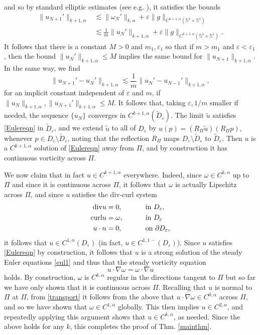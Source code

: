 \documentclass[11pt]{article}
\theoremstyle{plain}
\numberwithin{equation}{section}
\theoremstyle{remark}
\renewcommand{\div}{{\rm div}}
\newcommand{\curl}{{\rm curl}}
\newcommand{\ve}{{\varepsilon}}
\newcommand{\pa}{\partial}
\begin{document}
and so by standard elliptic estimates (see e.g. \cite{ADN64}), it satisfies the bounds
\begin{align}
  \label{}
  \|u_{N+1}'\|_{k+1, \alpha}
  &\lesssim \|\omega_N'\|_{k, \alpha} + 
  \ve\|g\|_{C^{k+1,\alpha}(\mathbb{S}^1\times \mathbb{S}^1)}\\
  &\lesssim  
  \frac{1}{m}\|u_N'\|_{k+1, \alpha} + \ve \|g\|_{C^{k+1,\alpha}(\mathbb{S}^1\times \mathbb{S}^1)}.
\end{align}
It follows that there is a constant $M > 0$ and $m_1, \ve_1$ so that if $m > m_1$ and $\ve < \ve_1$, 
then the bound $ \|u_N'\|_{k+1, \alpha} \leq M$ implies the same bound for $\|u_{N+1}\|_{k+1, \alpha}$.
In the same way, we find
\begin{equation}
  \label{}
  \|u_{N+1}' - u_{N}'\|_{k+1, \alpha} \lesssim \frac{1}{m} 
  \|u_N' - u_{N-1}'\|_{k+1, \alpha},
\end{equation}
for an implicit constant independent of $\ve$ and $m$,
if $\|u_{N}\|_{k+1,\alpha}, \|u_{N+1}'\|_{k+1,\alpha} \leq M.$
It follows that, taking $\ve, 1/m$ smaller if needed, the sequence $\{u_N\}$ converges
in $C^{k+1,\alpha}(\widetilde{D}_\ve)$. The limit $\widetilde{u}$
satisfies \eqref{Eulereqn} in $\widetilde{D}_\ve$, and 
we extend $\widetilde{u}$ to all of $D_\ve$ by
$
  u(p) = (R_\Pi\widetilde{u})(R_\Pi p),
  $
whenever $p \in D_\ve \setminus \widetilde{D}_\ve$, noting that
the reflection $R_\Pi$ maps $D_\ve \setminus \widetilde{D}_\ve$
to $\widetilde{D}_\ve$. 
Then $u$ is a $C^{k+1,\alpha}$ solution of \eqref{Eulereqn} away
from $\Pi$,
and by construction it has continuous vorticity
across $\Pi$. 

We now claim that in fact $u \in C^{k+1, \alpha}$ everywhere.
Indeed, since $\omega \in C^{k,\alpha}$ up to $\Pi$ and since it
is continuous across $\Pi$, it follows that $\omega$ is actually
Lipschitz across $\Pi$, and since $u$ satisfies the div-curl system
\begin{alignat}{2}
  \label{}
  \div u &=0, &&\qquad \text{ in } D_\ve,\\
  \curl u &= \omega, &&\qquad \text{ in } D_\ve\\ 
  u\cdot n &= 0, &&\qquad \text{ on } \pa D_\ve,
\end{alignat}
it follows that $u\in C^{1, \alpha}(D_\ve)$
(in fact, $u\in C^{1, 1-}(D_\ve)$).
Since $u$ satisfies \eqref{Eulereqn} by construction, it
follows that $u$ is a strong solution of the steady Euler equations
\eqref{eul1} and thus that the steady vorticity equation
\begin{equation}
  \label{transport}
    u\cdot \nabla \omega = \omega\cdot\nabla u
\end{equation}
holds. By construction, $\omega$ is $C^{k,\alpha}$ regular in the directions
tangent to $\Pi$ but so far we have only shown that it is continuous across $\Pi$.
Recalling that $u$ is normal to $\Pi$ at $\Pi$, from
\eqref{transport} it follows from the above that $u\cdot \nabla \omega
\in C^{0, \alpha}$ across $\Pi$, and so we have shown
that $\omega \in C^{1, \alpha}$ globally. This then implies $u \in C^{2, \alpha}$,
and repeatedly applying this argument shows that $u \in C^{k, \alpha}$, as needed.
Since the above holds for any $k$, this completes the proof of Thm. \ref{mainthm}. 
\end{document}
